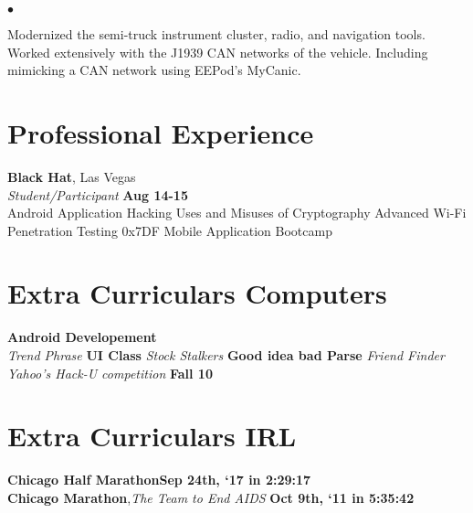 \documentclass[margin,line]{res}
\newenvironment{list2}{
  \begin{list}{$\bullet$}{
      \setlength{\itemsep}{0in}
      \setlength{\parsep}{0in} \setlength{\parskip}{0in}
      \setlength{\topsep}{0in} \setlength{\partopsep}{0in} 
      \setlength{\leftmargin}{0.2in}}}{\end{list}}
\begin{document}
\begin{resume}
\begin{list2}
  \item Modernized the semi-truck instrument cluster, radio, and navigation tools. Worked extensively with the J1939 CAN networks of the vehicle. Including mimicking a CAN network using EEPod’s MyCanic.
\end{list2}



\section{\sc Professional Experience}

{\bf {Black Hat}}, {Las Vegas}\\
{\em Student/Participant } \hfill {\bf Aug 14-15}\\
Android Application Hacking
Uses and Misuses of Cryptography
Advanced Wi-Fi Penetration Testing
0x7DF Mobile Application Bootcamp

\section{\sc Extra Curriculars Computers}
{\bf Android Developement }\\
{\em Trend Phrase} \hfill {\bf  UI Class}
{\em Stock Stalkers} \hfill {\bf Good idea bad Parse}
{\em Friend Finder Yahoo’s Hack-U competition} \hfill {\bf Fall 10}


\section{\sc Extra Curriculars IRL}

{\bf Chicago Half Marathon}\hfill {\bf  Sep 24th, `17 in 2:29:17 }\\

{\bf Chicago Marathon},{\em  The Team to End AIDS} \hfill {\bf  Oct 9th, `11 in 5:35:42}\\



\end{resume}
\end{document}
